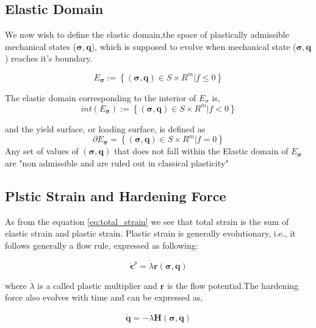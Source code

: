  \subsection*{Elastic Domain}
 We now wish to define the elastic domain,the space of plastically admissible mechanical states ($\bm\sigma, \bm q$), which is supposed to evolve when mechanical state ($\bm\sigma, \bm q$) reaches it's boundary.\cite{simo}
 
 \begin{equation}
 E_{\bm\sigma} := \left\lbrace (\bm \sigma, \bm q) \in S \times R^m | f \leq 0 \right\rbrace
 \end{equation}
 
The elastic domain corresponding to the interior of $E_\sigma$ is,
 \begin{equation}
  int (E_{\bm\sigma}) := \left\lbrace (\bm \sigma, \bm q) \in S \times R^m | f < 0 \right\rbrace
 \end{equation}
 
 and the yield surface, or loading surface, is defined as
 \begin{equation}
 \partial {E_{\bm\sigma}} =\left\lbrace (\bm \sigma, \bm q) \in S \times R^m | f = 0 \right\rbrace
 \end{equation}
 Any set of values of $(\bm\sigma, \bm q) $ that does not fall within the Elastic domain of $E_{\bm\sigma}$ are "non admissible and are ruled out in classical plasticity" \cite{simo}
 
 \subsection*{Plstic Strain and Hardening Force}
 As from the equation \ref{eq:total_strain} we see that total strain is the sum of elastic strain and plastic strain. Plastic strain is generally evolutionary, i.e., it follows generally a flow rule, expressed as following:
 
 \begin{equation}
 \dot{\bm\epsilon}^p = \dot{\lambda} \bm r(\bm \sigma, \bm q)
 \label{evol_eps_p}
 \end{equation}
 
 where $\dot{\lambda} $ is a called plastic multiplier and $\bm r$ is the flow potential.The hardening force also evolves with time and can be expressed as\cite{simo},
 
 \begin{equation}
 \dot {\bm q} = - \dot \lambda \bm H(\bm\sigma, \bm q)
 \end{equation}
 
